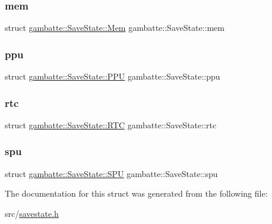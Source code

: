 \subsubsection{\texorpdfstring{mem}{mem}}
{\footnotesize\ttfamily struct \hyperlink{structgambatte_1_1SaveState_1_1Mem}{gambatte\+::\+Save\+State\+::\+Mem}  gambatte\+::\+Save\+State\+::mem}

\mbox{\label{structgambatte_1_1SaveState_a470cf7452cdd426d479cd337e1af1fea}} 
\subsubsection{\texorpdfstring{ppu}{ppu}}
{\footnotesize\ttfamily struct \hyperlink{structgambatte_1_1SaveState_1_1PPU}{gambatte\+::\+Save\+State\+::\+P\+PU}  gambatte\+::\+Save\+State\+::ppu}

\mbox{\label{structgambatte_1_1SaveState_ae9dd999c313ced5717f389cf3565556a}} 
\subsubsection{\texorpdfstring{rtc}{rtc}}
{\footnotesize\ttfamily struct \hyperlink{structgambatte_1_1SaveState_1_1RTC}{gambatte\+::\+Save\+State\+::\+R\+TC}  gambatte\+::\+Save\+State\+::rtc}

\mbox{\label{structgambatte_1_1SaveState_a0cd87c59e350952e3e12d3d2c1399d0f}} 
\subsubsection{\texorpdfstring{spu}{spu}}
{\footnotesize\ttfamily struct \hyperlink{structgambatte_1_1SaveState_1_1SPU}{gambatte\+::\+Save\+State\+::\+S\+PU}  gambatte\+::\+Save\+State\+::spu}



The documentation for this struct was generated from the following file\+:\begin{DoxyCompactItemize}
\item 
src/\hyperlink{savestate_8h}{savestate.\+h}\end{DoxyCompactItemize}
